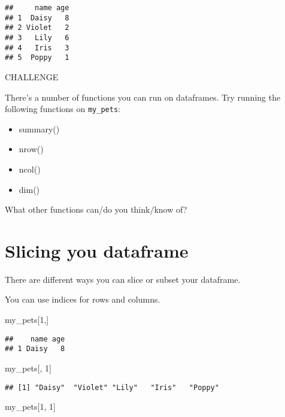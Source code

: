 \documentclass[]{book}
\newenvironment{Shaded}{\begin{snugshade}}{\end{snugshade}}
\newcommand{\DecValTok}[1]{\textcolor[rgb]{0.00,0.00,0.81}{#1}}
\newcommand{\NormalTok}[1]{#1}
\begin{document}
\begin{verbatim}
##     name age
## 1  Daisy   8
## 2 Violet   2
## 3   Lily   6
## 4   Iris   3
## 5  Poppy   1
\end{verbatim}

\leavevmode\hypertarget{challenge}{}%
CHALLENGE

There's a number of functions you can run on dataframes. Try running the following functions on \texttt{my\_pets}:

\begin{itemize}
\item
  summary()
\item
  nrow()
\item
  ncol()
\item
  dim()
\end{itemize}

What other functions can/do you think/know of?

\hypertarget{slicing-you-dataframe}{%
\section{Slicing you dataframe}\label{slicing-you-dataframe}}

There are different ways you can slice or subset your dataframe.

You can use indices for rows and columns.

\begin{Shaded}
\begin{Highlighting}[]
\NormalTok{my_pets[}\DecValTok{1}\NormalTok{,]}
\end{Highlighting}
\end{Shaded}

\begin{verbatim}
##    name age
## 1 Daisy   8
\end{verbatim}

\begin{Shaded}
\begin{Highlighting}[]
\NormalTok{my_pets[, }\DecValTok{1}\NormalTok{]}
\end{Highlighting}
\end{Shaded}

\begin{verbatim}
## [1] "Daisy"  "Violet" "Lily"   "Iris"   "Poppy"
\end{verbatim}

\begin{Shaded}
\begin{Highlighting}[]
\NormalTok{my_pets[}\DecValTok{1}\NormalTok{, }\DecValTok{1}\NormalTok{]}
\end{Highlighting}
\end{Shaded}
\end{document}

